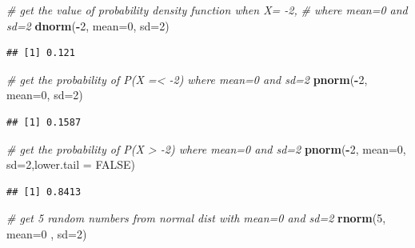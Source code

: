 \documentclass[12pt,]{krantz}
\newenvironment{Shaded}{\begin{snugshade}}{\end{snugshade}}
\newcommand{\CommentTok}[1]{\textcolor[rgb]{0.56,0.35,0.01}{\textit{#1}}}
\newcommand{\DataTypeTok}[1]{\textcolor[rgb]{0.13,0.29,0.53}{#1}}
\newcommand{\DecValTok}[1]{\textcolor[rgb]{0.00,0.00,0.81}{#1}}
\newcommand{\KeywordTok}[1]{\textcolor[rgb]{0.13,0.29,0.53}{\textbf{#1}}}
\newcommand{\NormalTok}[1]{#1}
\newcommand{\OperatorTok}[1]{\textcolor[rgb]{0.81,0.36,0.00}{\textbf{#1}}}
\newcommand{\OtherTok}[1]{\textcolor[rgb]{0.56,0.35,0.01}{#1}}
\theoremstyle{definition}
\theoremstyle{definition}
\theoremstyle{definition}
\theoremstyle{remark}
\begin{document}
\begin{Shaded}
\begin{Highlighting}[]
\CommentTok{# get the value of probability density function when X= -2,}
\CommentTok{# where mean=0 and sd=2}
\KeywordTok{dnorm}\NormalTok{(}\OperatorTok{-}\DecValTok{2}\NormalTok{, }\DataTypeTok{mean=}\DecValTok{0}\NormalTok{, }\DataTypeTok{sd=}\DecValTok{2}\NormalTok{)}
\end{Highlighting}
\end{Shaded}

\begin{verbatim}
## [1] 0.121
\end{verbatim}

\begin{Shaded}
\begin{Highlighting}[]
\CommentTok{# get the probability of P(X =< -2) where mean=0 and sd=2}
\KeywordTok{pnorm}\NormalTok{(}\OperatorTok{-}\DecValTok{2}\NormalTok{, }\DataTypeTok{mean=}\DecValTok{0}\NormalTok{, }\DataTypeTok{sd=}\DecValTok{2}\NormalTok{)}
\end{Highlighting}
\end{Shaded}

\begin{verbatim}
## [1] 0.1587
\end{verbatim}

\begin{Shaded}
\begin{Highlighting}[]
\CommentTok{# get the probability of P(X > -2) where mean=0 and sd=2}
\KeywordTok{pnorm}\NormalTok{(}\OperatorTok{-}\DecValTok{2}\NormalTok{, }\DataTypeTok{mean=}\DecValTok{0}\NormalTok{, }\DataTypeTok{sd=}\DecValTok{2}\NormalTok{,}\DataTypeTok{lower.tail =} \OtherTok{FALSE}\NormalTok{)}
\end{Highlighting}
\end{Shaded}

\begin{verbatim}
## [1] 0.8413
\end{verbatim}

\begin{Shaded}
\begin{Highlighting}[]
\CommentTok{# get 5 random numbers from normal dist with  mean=0 and sd=2}
\KeywordTok{rnorm}\NormalTok{(}\DecValTok{5}\NormalTok{, }\DataTypeTok{mean=}\DecValTok{0}\NormalTok{ , }\DataTypeTok{sd=}\DecValTok{2}\NormalTok{)}
\end{Highlighting}
\end{Shaded}
\end{document}
